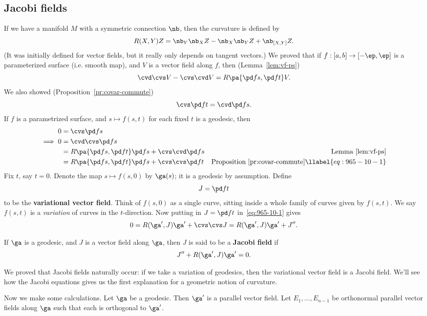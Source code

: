
\subsection{Jacobi fields}
If we have a manifold $M$ with a symmetric connection $\nb$, then the curvature is defined by 
\[
R(X,Y)Z=\nb_Y\nb_XZ-\nb_X\nb_Y Z+\nb_{[X,Y]}Z.
\]
(It was initially defined for vector fields, but it really only depends on tangent vectors.) We proved that if $f:[a,b]\to [-\ep,\ep]$ is a parameterized surface (i.e. smooth map), and $V$ is a vector field along $f$, then (Lemma~\ref{lem:vf-ps})
\[
\cvd \cvs V-\cvs \cvd V=R\pa{\pd fs,\pd ft}V.
\]
We also showed (Proposition~\ref{pr:covar-commute})
\[
\cvs \pd ft=\cvd \pd fs.
\]
If $f$ is a parametrized surface, and $s\mapsto f(s,t)$ for each fixed $t$ is a geodesic, then 
\begin{align}
\nonumber
0&=\cvs \pd fs\\
\nonumber
\implies 0&=\cvd \cvs \pd fs\\
\nonumber&=R\pa{\pd fs,\pd ft}\pd fs + \cvs\cvd \pd fs&\text{Lemma~\ref{lem:vf-ps}}\\
&=R\pa{\pd fs,\pd ft}\pd fs + \cvs\cvs \pd ft&\text{Proposition~\ref{pr:covar-commute}}
\llabel{eq:965-10-1}
\end{align}
Fix $t$, say $t=0$. Denote the map $s\mapsto f(s,0)$ by $\ga(s)$; it is a geodesic by assumption. Define
\[
J=\pd ft
\]
to be the \textbf{variational vector field}.
Think of $f(s,0)$ as  a single curve, sitting inside a whole family of curves given by $f(s,t)$. We say $f(s,t)$ is a {\it variation} of curves in the $t$-direction. Now putting in $J=\pd ft$ in~\eqref{eq:965-10-1} gives
\[
0=R(\ga',J)\ga'+\cvs \cvs J=R(\ga',J)\ga'+J''.
\]
\begin{df}
If $\ga$ is a geodesic, and $J$ is a vector field along $\ga$, then $J$ is said to be a \textbf{Jacobi field} if 
\[J''+R(\ga',J)\ga'=0.\]
\end{df}
We proved that Jacobi fields naturally occur: if we take a variation of geodesics, then the variational vector field is a Jacobi field. We'll see how the Jacobi equations gives us the first explanation for a geometric notion of curvature.

Now we make some calculations. Let $\ga$ be a geodesic. Then $\ga'$ is a parallel vector field. Let $E_1,\ldots, E_{n-1}$ be orthonormal parallel vector fields along $\ga$ such that each is orthogonal to $\ga'$. 

